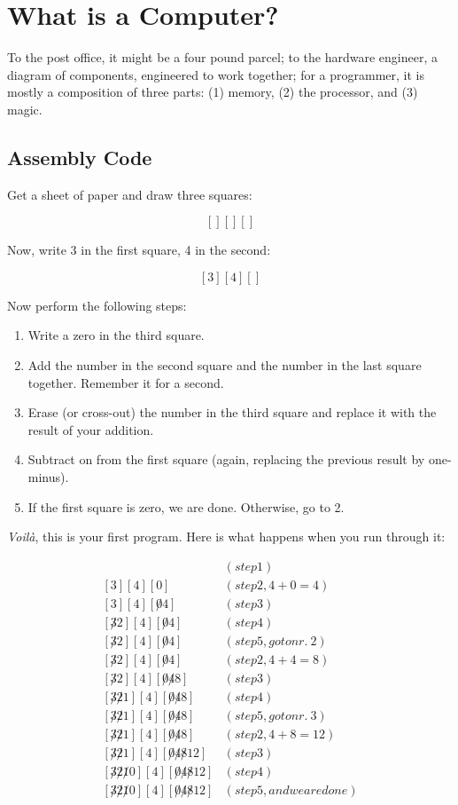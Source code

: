 \chapter{What is a Computer?}

To the post office, it might be a four pound parcel; to the hardware engineer,
a diagram of components, engineered to work together; for a programmer, it is
mostly a composition of three parts: (1) memory, (2) the processor, and (3)
magic.

\section{Assembly Code}

Get a sheet of paper and draw three squares:

\[
[ ] [ ] [ ]
\]

Now, write 3 in the first square, 4 in the second:

\[
[ 3 ] [ 4 ] [  ]
\]

Now perform the following steps:

\begin{enumerate}
\item Write a zero in the third square.
\item Add the number in the second square and the number in the last square
together. Remember it for a second.
\item Erase (or cross-out) the number in the third square and replace it with
the result of your addition.
\item Subtract on from the first square (again, replacing the previous result
by one-minus).
\item If the first square is zero, we are done. Otherwise, go to 2.
\end{enumerate}

\emph{Voilà}, this is your first program. Here is what happens when you run through it:

\begin{align*}
[ 3 ] [ 4 ] [ 0 ] & (step 1)\\
[ 3 ] [ 4 ] [ 0 ] & (step 2, 4+0=4)\\
[ 3 ] [ 4 ] [ \not0 4 ] & (step 3)\\
[ \not3 2 ] [ 4 ] [ \not0 4 ] & (step 4)\\
[ \not3 2 ] [ 4 ] [ \not0 4 ] & (step 5, go to nr.\ 2)\\
[ \not3 2 ] [ 4 ] [ \not0 4 ] & (step 2, 4+4=8)\\
[ \not3 2 ] [ 4 ] [ \not0 \not4 8 ] & (step 3)\\
[ \not3 \not2 1 ] [ 4 ] [ \not0 \not4 8 ] & (step 4)\\
[ \not3 \not2 1 ] [ 4 ] [ \not0 \not4 8 ] & (step 5, go to nr.\ 3)\\
[ \not3 \not2 1 ] [ 4 ] [ \not0 \not4 8 ] & (step 2, 4+8=12)\\
[ \not3 \not2 1 ] [ 4 ] [ \not0 \not4 \not8 12 ] & (step 3)\\
[ \not3 \not2 \not1 0 ] [ 4 ] [ \not0 \not4 \not8 12 ] & (step 4)\\
[ \not3 \not2 \not1 0 ] [ 4 ] [ \not0 \not4 \not8 12 ] & (step 5, and we are done)
\end{align*}

